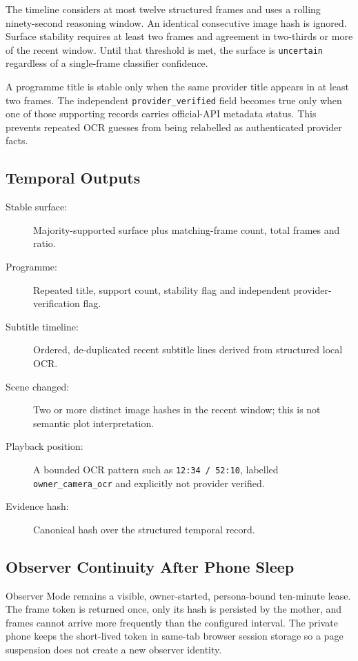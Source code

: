 The timeline considers at most twelve structured frames and uses a rolling
ninety-second reasoning window.  An identical consecutive image hash is ignored.
Surface stability requires at least two frames and agreement in two-thirds or
more of the recent window.  Until that threshold is met, the surface is
\texttt{uncertain} regardless of a single-frame classifier confidence.

A programme title is stable only when the same provider title appears in at
least two frames.  The independent \texttt{provider\_verified} field becomes true
only when one of those supporting records carries official-API metadata status.
This prevents repeated OCR guesses from being relabelled as authenticated
provider facts.

\subsection{Temporal Outputs}

\begin{description}
  \item[Stable surface:] Majority-supported surface plus matching-frame count,
  total frames and ratio.
  \item[Programme:] Repeated title, support count, stability flag and independent
  provider-verification flag.
  \item[Subtitle timeline:] Ordered, de-duplicated recent subtitle lines derived
  from structured local OCR.
  \item[Scene changed:] Two or more distinct image hashes in the recent window;
  this is not semantic plot interpretation.
  \item[Playback position:] A bounded OCR pattern such as
  \texttt{12:34 / 52:10}, labelled \texttt{owner\_camera\_ocr} and explicitly
  not provider verified.
  \item[Evidence hash:] Canonical hash over the structured temporal record.
\end{description}

\subsection{Observer Continuity After Phone Sleep}

Observer Mode remains a visible, owner-started, persona-bound ten-minute lease.
The frame token is returned once, only its hash is persisted by the mother, and
frames cannot arrive more frequently than the configured interval.  The private
phone keeps the short-lived token in same-tab browser session storage so a page
suspension does not create a new observer identity.

